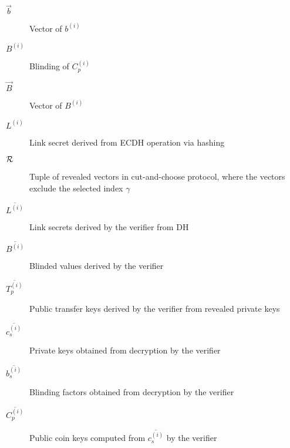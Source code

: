 \documentclass{llncs}
\begin{document}
\begin{description}
  \item[$\vec{b}$]{Vector of $b^{(i)}$}
  \item[$B^{(i)}$]{Blinding of $C_p^{(i)}$}
  \item[$\vec{B}$]{Vector of $B^{(i)}$}
  \item[$L^{(i)}$]{Link secret derived from ECDH operation via hashing}
  \item[$\cal{R}$]{Tuple of revealed vectors in cut-and-choose protocol,
    where the vectors exclude the selected index $\gamma$}
  \item[$\overline{L^{(i)}}$]{Link secrets derived by the verifier from DH}
  \item[$\overline{B^{(i)}}$]{Blinded values derived by the verifier}
  \item[$\overline{T_p^{(i)}}$]{Public transfer keys derived by the verifier from revealed private keys}
  \item[$\overline{c_s^{(i)}}$]{Private keys obtained from decryption by the verifier}
  \item[$\overline{b_s^{(i)}}$]{Blinding factors obtained from decryption by the verifier}
  \item[$\overline{C^{(i)}_p}$]{Public coin keys computed from $\overline{c_s^{(i)}}$ by the verifier}
\end{description}
\end{document}

